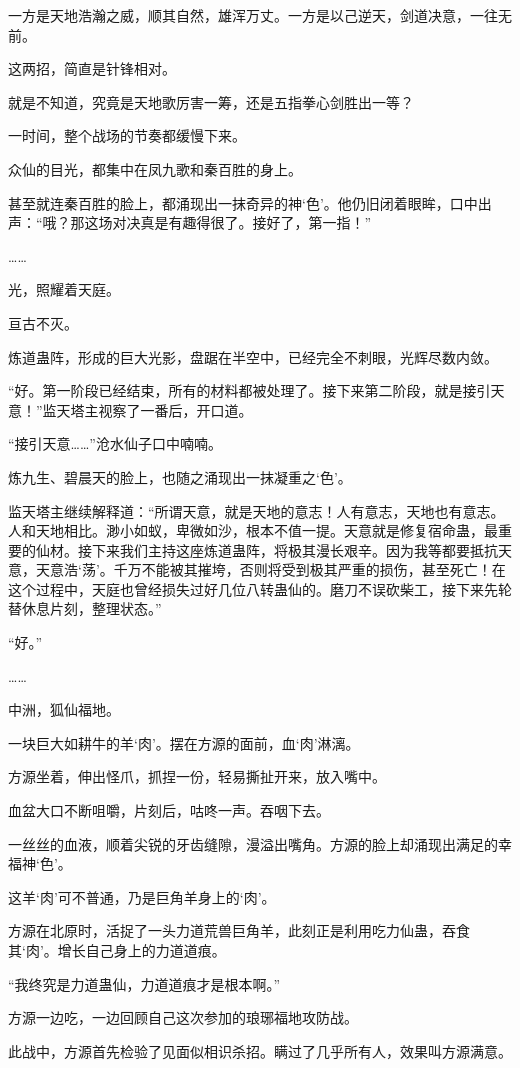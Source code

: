 \begin{this_body}
一方是天地浩瀚之威，顺其自然，雄浑万丈。一方是以己逆天，剑道决意，一往无前。

这两招，简直是针锋相对。

就是不知道，究竟是天地歌厉害一筹，还是五指拳心剑胜出一等？

一时间，整个战场的节奏都缓慢下来。

众仙的目光，都集中在凤九歌和秦百胜的身上。

甚至就连秦百胜的脸上，都涌现出一抹奇异的神‘色’。他仍旧闭着眼眸，口中出声：“哦？那这场对决真是有趣得很了。接好了，第一指！”

……

光，照耀着天庭。

亘古不灭。

炼道蛊阵，形成的巨大光影，盘踞在半空中，已经完全不刺眼，光辉尽数内敛。

“好。第一阶段已经结束，所有的材料都被处理了。接下来第二阶段，就是接引天意！”监天塔主视察了一番后，开口道。

“接引天意……”沧水仙子口中喃喃。

炼九生、碧晨天的脸上，也随之涌现出一抹凝重之‘色’。

监天塔主继续解释道：“所谓天意，就是天地的意志！人有意志，天地也有意志。人和天地相比。渺小如蚁，卑微如沙，根本不值一提。天意就是修复宿命蛊，最重要的仙材。接下来我们主持这座炼道蛊阵，将极其漫长艰辛。因为我等都要抵抗天意，天意浩‘荡’。千万不能被其摧垮，否则将受到极其严重的损伤，甚至死亡！在这个过程中，天庭也曾经损失过好几位八转蛊仙的。磨刀不误砍柴工，接下来先轮替休息片刻，整理状态。”

“好。”

……

中洲，狐仙福地。

一块巨大如耕牛的羊‘肉’。摆在方源的面前，血‘肉’淋漓。

方源坐着，伸出怪爪，抓捏一份，轻易撕扯开来，放入嘴中。

血盆大口不断咀嚼，片刻后，咕咚一声。吞咽下去。

一丝丝的血液，顺着尖锐的牙齿缝隙，漫溢出嘴角。方源的脸上却涌现出满足的幸福神‘色’。

这羊‘肉’可不普通，乃是巨角羊身上的‘肉’。

方源在北原时，活捉了一头力道荒兽巨角羊，此刻正是利用吃力仙蛊，吞食其‘肉’。增长自己身上的力道道痕。

“我终究是力道蛊仙，力道道痕才是根本啊。”

方源一边吃，一边回顾自己这次参加的琅琊福地攻防战。

此战中，方源首先检验了见面似相识杀招。瞒过了几乎所有人，效果叫方源满意。


\end{this_body}
